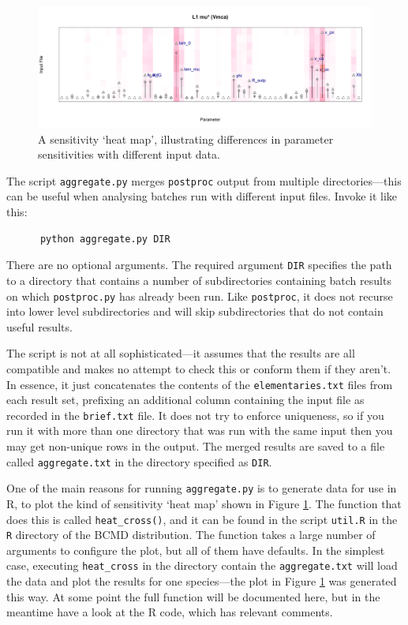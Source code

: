 \documentclass[a4paper,11pt]{article}
\begin{document}
\begin{figure}[tbph]
\begin{center}
\includegraphics[scale=0.5]{figures/heatmap.pdf}
\caption{A sensitivity `heat map', illustrating differences in parameter sensitivities with different input data.}
\label{fig:batch:heat}
\end{center}
\end{figure}

The script \texttt{aggregate.py} merges \texttt{postproc} output from multiple directories---this can be useful when analysing batches run with different input files. Invoke it like this:
\begin{verbatim}
      python aggregate.py DIR
\end{verbatim}
There are no optional arguments. The required argument \texttt{DIR} specifies the path to a directory that contains a number of subdirectories containing batch results on which \texttt{postproc.py} has already been run. Like \texttt{postproc}, it does not recurse into lower level subdirectories and will skip subdirectories that do not contain useful results.

The script is not at all sophisticated---it assumes that the results are all compatible and makes no attempt to check this or conform them if they aren't. In essence, it just concatenates the contents of the \texttt{elementaries.txt} files from each result set, prefixing an additional column containing the input file as recorded in the \texttt{brief.txt} file. It does not try to enforce uniqueness, so if you run it with more than one directory that was run with the same input then you may get non-unique rows in the output. The merged results are saved to a file called \texttt{aggregate.txt} in the directory specified as \texttt{DIR}.

One of the main reasons for running \texttt{aggregate.py} is to generate data for use in R, to plot the kind of sensitivity `heat map' shown in Figure \ref{fig:batch:heat}. The function that does this is called \texttt{heat\_cross()}, and it can be found in the script \texttt{util.R} in the \texttt{R} directory of the BCMD distribution. The function takes a large number of arguments to configure the plot, but all of them have defaults. In the simplest case, executing \texttt{heat\_cross} in the directory contain the \texttt{aggregate.txt} will load the data and plot the results for one species---the plot in Figure \ref{fig:batch:heat} was generated this way. At some point the full function will be documented here, but in the meantime have a look at the R code, which has relevant comments.
\end{document}
